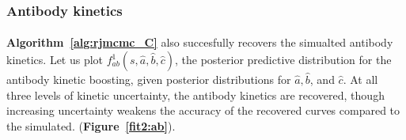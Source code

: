 \subsubsection{Antibody kinetics}
\paragraph{} \textbf{Algorithm~\ref{alg:rjmcmc_C}} also succesfully recovers the simualted antibody kinetics. Let us plot $f^1_{ab}(s, \hat{a}, \hat{b}, \hat{c})$, the posterior predictive distribution for the antibody kinetic boosting, given posterior distributions for $ \hat{a}, \hat{b}$, and $\hat{c}$. At all three levels of kinetic uncertainty, the antibody kinetics are recovered, though increasing uncertainty weakens the accuracy of the recovered curves compared to the simulated. (\textbf{Figure~\ref{fit2:ab}}).

